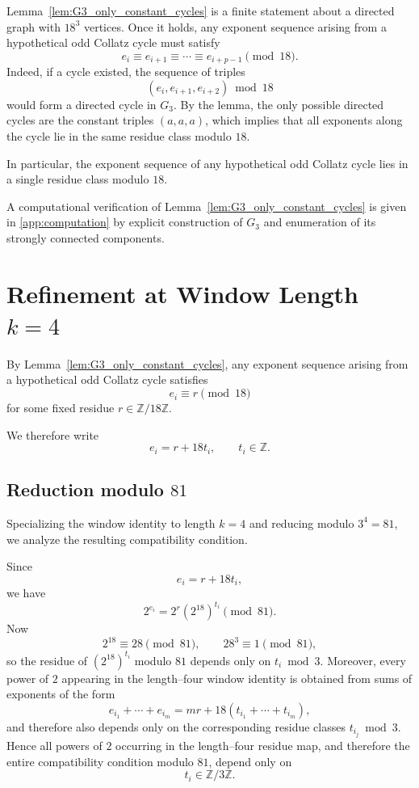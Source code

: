 \documentclass[11pt]{article}
\theoremstyle{definition}
\theoremstyle{plain}
\theoremstyle{remark}
\begin{document}
Lemma~\ref{lem:G3_only_constant_cycles} is a finite statement about a
directed graph with $18^3$ vertices. Once it holds, any exponent sequence
arising from a hypothetical odd Collatz cycle must satisfy
\[
e_i \equiv e_{i+1} \equiv \cdots \equiv e_{i+p-1} \pmod{18}.
\]
Indeed, if a cycle existed, the sequence of triples
\[
(e_i,e_{i+1},e_{i+2}) \bmod 18
\]
would form a directed cycle in $G_3$. By the lemma, the only possible
directed cycles are the constant triples $(a,a,a)$, which implies that
all exponents along the cycle lie in the same residue class modulo $18$.

In particular, the exponent sequence of any hypothetical odd Collatz cycle
lies in a single residue class modulo $18$.

\medskip
A computational verification of Lemma~\ref{lem:G3_only_constant_cycles} is
given in \ref{app:computation} by explicit construction of $G_3$ and enumeration of
its strongly connected components.

\section{Refinement at Window Length $k=4$}\label{sec:k4}

By Lemma~\ref{lem:G3_only_constant_cycles}, any exponent sequence arising
from a hypothetical odd Collatz cycle satisfies
\[
e_i \equiv r \pmod{18}
\]
for some fixed residue $r \in \mathbb{Z}/18\mathbb{Z}$.

We therefore write
\[
e_i = r + 18 t_i,
\qquad t_i \in \mathbb{Z}.
\]

\subsection{Reduction modulo $81$}

Specializing the window identity to length $k=4$ and reducing modulo
$3^4 = 81$, we analyze the resulting compatibility condition.

Since
\[
e_i = r+18t_i,
\]
we have
\[
2^{e_i}=2^r(2^{18})^{t_i}\pmod{81}.
\]
Now
\[
2^{18}\equiv 28\pmod{81},
\qquad
28^3\equiv 1\pmod{81},
\]
so the residue of $(2^{18})^{t_i}$ modulo $81$ depends only on $t_i\bmod 3$.
Moreover, every power of $2$ appearing in the length--four window identity
is obtained from sums of exponents of the form
\[
e_{i_1}+\cdots+e_{i_m}
= mr + 18(t_{i_1}+\cdots+t_{i_m}),
\]
and therefore also depends only on the corresponding residue classes
$t_{i_j}\bmod 3$.
Hence all powers of $2$ occurring in the length--four residue map, and
therefore the entire compatibility condition modulo $81$, depend only on
\[
t_i \in \mathbb{Z}/3\mathbb{Z}.
\]
\end{document}
